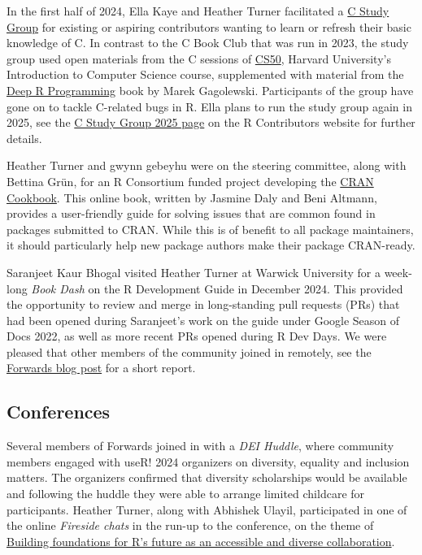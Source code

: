 In the first half of 2024, Ella Kaye and Heather Turner facilitated a \href{https://contributor.r-project.org/events/c-study-group-2024/}{C
Study Group} for
existing or aspiring contributors wanting to learn or refresh their basic
knowledge of C. In contrast to the C Book Club that was run in 2023, the
study group used open materials from the C sessions of \href{https://cs50.harvard.edu/x/2024/}{CS50},
Harvard University's Introduction to Computer Science course, supplemented with
material from the \href{https://deepr.gagolewski.com/chapter/310-compiled.html}{Deep R Programming}
book by Marek Gagolewski. Participants of the group have gone on to tackle
C-related bugs in R. Ella plans to run the study group again in 2025, see the \href{https://contributor.r-project.org/events/c-study-group-2025/}{C Study Group 2025 page} on the R Contributors website for further details.

Heather Turner and gwynn gebeyhu were on the steering committee, along with
Bettina Grün, for an R Consortium funded project developing the
\href{https://contributor.r-project.org/cran-cookbook/}{CRAN Cookbook}. This online
book, written by Jasmine Daly and Beni Altmann, provides a user-friendly guide
for solving issues that are common found in packages submitted to CRAN. While
this is of benefit to all package maintainers, it should particularly help
new package authors make their package CRAN-ready.

Saranjeet Kaur Bhogal visited Heather Turner at Warwick University for a
week-long \emph{Book Dash} on the R Development Guide in December 2024. This provided the opportunity
to review and merge in long-standing pull requests (PRs) that had been opened
during Saranjeet's work on the guide under Google Season of Docs 2022, as well
as more recent PRs opened during R Dev Days. We were pleased that other members
of the community joined in remotely, see the \href{https://forwards.github.io/blog/2024/rdevguide/}{Forwards blog post}
for a short report.

\hypertarget{conferences}{%
\subsection{Conferences}\label{conferences}}

Several members of Forwards joined in with a \emph{DEI Huddle}, where community
members engaged with useR! 2024 organizers on diversity, equality and inclusion
matters. The organizers confirmed that diversity scholarships would be available
and following the huddle they were able to arrange limited childcare for
participants. Heather Turner, along with Abhishek Ulayil, participated in one
of the online \emph{Fireside chats} in the run-up to the conference, on the theme of
\href{https://www.youtube.com/watch?v=18-QFbLC2cY}{Building foundations for R's future as an accessible and diverse collaboration}.

